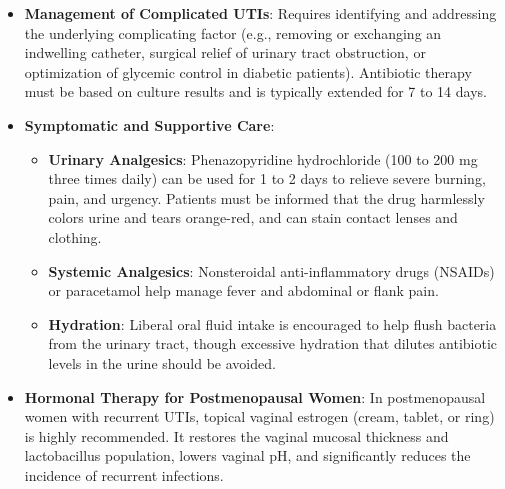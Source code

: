 \begin{itemize}
\begin{itemize}
        \item \textbf{Inpatient Management}: Indicated for patients with high fever, severe pain, persistent vomiting, hemodynamic instability, or those who are pregnant or immunocompromised.
        \begin{itemize}
            \item Empiric intravenous therapy typically involves a broad-spectrum cephalosporin (e.g., ceftriaxone 1 to 2 g daily) or an extended-spectrum penicillin/beta-lactamase inhibitor (e.g., piperacillin-tazobactam 3.375 to 4.5 g every 6 hours).
            \item Carbapenems (e.g., ertapenem 1 g daily, meropenem 1 g every 8 hours) are indicated if infection by an extended-spectrum beta-lactamase (ESBL)-producing pathogen is suspected.
            \item Therapy should be tailored to the results of urine and blood cultures. Once the patient is afebrile for 24 to 48 hours and clinically stable, they can transition to oral antibiotics to complete a 10- to 14-day total course.
        \end{itemize}
    \end{itemize}
    \item \textbf{Management of Complicated UTIs}: Requires identifying and addressing the underlying complicating factor (e.g., removing or exchanging an indwelling catheter, surgical relief of urinary tract obstruction, or optimization of glycemic control in diabetic patients). Antibiotic therapy must be based on culture results and is typically extended for 7 to 14 days.
    \item \textbf{Symptomatic and Supportive Care}:
    \begin{itemize}
        \item \textbf{Urinary Analgesics}: Phenazopyridine hydrochloride (100 to 200 mg three times daily) can be used for 1 to 2 days to relieve severe burning, pain, and urgency. Patients must be informed that the drug harmlessly colors urine and tears orange-red, and can stain contact lenses and clothing.
        \item \textbf{Systemic Analgesics}: Nonsteroidal anti-inflammatory drugs (NSAIDs) or paracetamol help manage fever and abdominal or flank pain.
        \item \textbf{Hydration}: Liberal oral fluid intake is encouraged to help flush bacteria from the urinary tract, though excessive hydration that dilutes antibiotic levels in the urine should be avoided.
    \end{itemize}
    \item \textbf{Hormonal Therapy for Postmenopausal Women}: In postmenopausal women with recurrent UTIs, topical vaginal estrogen (cream, tablet, or ring) is highly recommended. It restores the vaginal mucosal thickness and lactobacillus population, lowers vaginal pH, and significantly reduces the incidence of recurrent infections.
\end{itemize}

